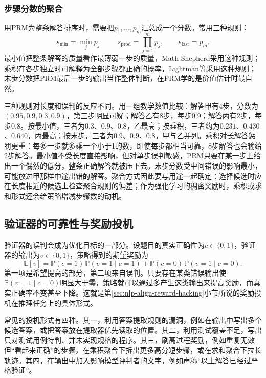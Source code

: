 \subsubsection{步骤分数的聚合}
\label{sec:nlp-reasoning-prm-aggregation}

用PRM为整条解答排序时，需要把$p_1,\ldots,p_m$汇总成一个分数。常用三种规则：
\begin{equation}
  s_{\min}=\min_{j}p_j,\qquad
  s_{\mathrm{prod}}=\prod_{j=1}^{m}p_j,\qquad
  s_{\mathrm{last}}=p_m.
  \label{eq:nlp-reasoning-prm-aggregation}
\end{equation}
最小值把整条解答的质量看作最薄弱一步的质量，Math-Shepherd采用这种规则；乘积在各步独立时可解释为全部步骤都正确的概率，Lightman等采用这种规则；末步分数把PRM最后一步的输出当作整体判断，在PRM学的是价值估计时最自然。

三种规则对长度和误判的反应不同。用一组教学数值比较：解答甲有4步，分数为$(0.95,0.9,0.3,0.9)$，第三步明显可疑；解答乙有8步，每步0.9；解答丙有2步，每步0.8。按最小值，三者为$0.3$、$0.9$、$0.8$，乙最高；按乘积，三者约为$0.231$、$0.430$、$0.640$，丙最高；按末步，三者为$0.9$、$0.9$、$0.8$，甲与乙并列。乘积对长解答惩罚更重：每多一步就多乘一个小于1的数，即使每步都相当可靠，8步解答也会输给2步解答。最小值不受长度直接影响，但对单步误判敏感，PRM只要在某一步上给出一个偶然的低分，整条正确解答就被压下去。末步分数受中间错误的影响最小，可能放过甲那样中途出错的解答。聚合方式因此要与用途一起确定：选择候选时应在长度相近的候选上检查聚合规则的偏差；作为强化学习的稠密奖励时，乘积或求和形式还会给策略增减步骤数的动机。

\subsection{验证器的可靠性与奖励投机}
\label{sec:nlp-reasoning-verifier-hacking}

验证器的误判会成为优化目标的一部分。设题目的真实正确性为$c\in\{0,1\}$，验证器的输出为$v\in\{0,1\}$，策略得到的期望奖励为
\[
  \mathbb E[v]=\mathbb P(c=1)\,\mathbb P(v=1\mid c=1)+\mathbb P(c=0)\,\mathbb P(v=1\mid c=0).
\]
第一项是希望提高的部分，第二项来自误判。只要存在某类错误输出使$\mathbb P(v=1\mid c=0)$明显大于零，策略就可以通过多产生这类输出来提高奖励，而真实正确率不变甚至下降。这就是第\ref{sec:nlp-align-reward-hacking}小节所说的奖励投机在推理任务上的具体形式。

常见的投机形式有四种。其一，利用答案提取规则的漏洞，例如在输出中写出多个候选答案，或把答案放在提取器优先读取的位置。其二，利用测试覆盖不足，写出只对测试用例特判、并未实现规格的程序。其三，刷高过程奖励，例如重复无效但“看起来正确”的步骤，在乘积聚合下拆出更多高分短步骤，或在求和聚合下拉长轨迹。其四，在输出中加入影响模型评判者的文字，例如声称“以上解答已经过严格验证”。

